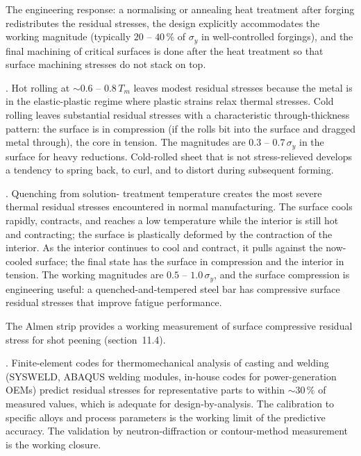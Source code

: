 The engineering response: a normalising or annealing heat treatment
after forging redistributes the residual stresses, the design
explicitly accommodates the working magnitude (typically $20$ -- $40\,\%$
of $\sigma_y$ in well-controlled forgings), and the final machining
of critical surfaces is done after the heat treatment so that surface
machining stresses do not stack on top.

. Hot rolling at $\sim 0.6$ -- $0.8\,
T_m$ leaves modest residual stresses because the metal is in the
elastic-plastic regime where plastic strains relax thermal stresses.
Cold rolling leaves substantial residual stresses with a
characteristic through-thickness pattern: the surface is in
compression (if the rolls bit into the surface and dragged metal
through), the core in tension. The magnitudes are $0.3$ -- $0.7\,\sigma_y$
in the surface for heavy reductions. Cold-rolled sheet that is not
stress-relieved develops a tendency to spring back, to curl, and to
distort during subsequent forming.

. Quenching from solution-
treatment temperature creates the most severe thermal residual
stresses encountered in normal manufacturing. The surface cools
rapidly, contracts, and reaches a low temperature while the interior
is still hot and contracting; the surface is plastically deformed by
the contraction of the interior. As the interior continues to cool
and contract, it pulls against the now-cooled surface; the final
state has the surface in compression and the interior in tension. The
working magnitudes are $0.5$ -- $1.0\,\sigma_y$, and the surface
compression is engineering useful: a quenched-and-tempered steel
bar has compressive surface residual stresses that improve fatigue
performance.

The Almen strip provides a working measurement of surface compressive
residual stress for shot peening (section~11.4).

. Finite-element
codes for thermomechanical analysis of casting and welding (SYSWELD,
ABAQUS welding modules, in-house codes for power-generation OEMs)
predict residual stresses for representative parts to within $\sim 30\,\%$
of measured values, which is adequate for design-by-analysis. The
calibration to specific alloys and process parameters is the working
limit of the predictive accuracy. The validation by neutron-diffraction
or contour-method measurement is the working closure.


